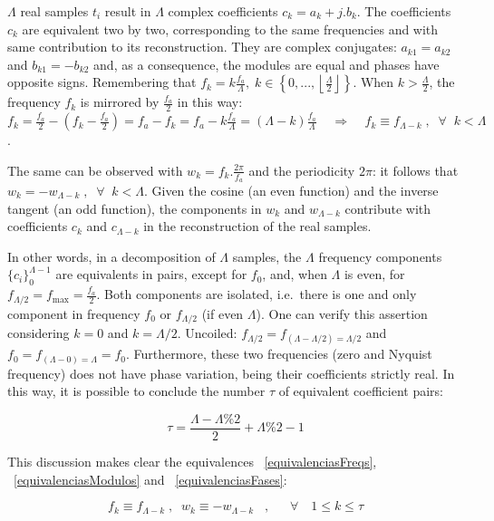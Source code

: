\documentclass[
 aip,
 jmp,
 amsmath,amssymb,
 reprint,
]{revtex4-1}
\begin{document}
$\Lambda$ real samples $t_i$ result in $\Lambda$ complex coefficients $c_k=a_k+j.b_k$. The coefficients $c_k$ are equivalent two by two, corresponding to the same frequencies and with same contribution to its reconstruction. They are complex conjugates: $a_{k1}=a_{k2}$ and $b_{k1}=-b_{k2}$ and, as a consequence, the modules are equal and phases have opposite signs. Remembering that $f_k = k\frac{f_a}{\Lambda}, \; k \in \left\{0, ..., \left \lfloor \frac{\Lambda}{2} \right \rfloor \right\} $. When $k > \frac{\Lambda}{2}$, the frequency $f_k$ is mirrored by $\frac{f_a}{2}$ in this way: $f_k=\frac{f_a}{2} - (f_k-\frac{f_a}{2})=f_a-f_k=f_a - k\frac{f_a}{\Lambda}=(\Lambda-k)\frac{f_a}{\Lambda} \;\;\;\; \Rightarrow \;\;\;\; f_k\equiv f_{\Lambda-k} \; ,\;\; \forall \;\; k<\Lambda$. 

The same can be observed with $w_k=f_k.\frac{2\pi}{f_a}$ and the periodicity $2\pi$: it follows that $w_k=-w_{\Lambda-k} \; ,\;\; \forall \;\; k<\Lambda$. Given the cosine (an even function) and the inverse tangent (an odd function), the components in $w_k$ and $w_{\Lambda-k}$ contribute with coefficients $c_k$ and $c_{\Lambda-k}$ in the reconstruction of the real samples.

In other words, in a decomposition of $\Lambda$ samples, the $\Lambda$ frequency components $\{c_i\}_0^{\Lambda-1}$ are equivalents in pairs,
except for $f_0$, and, when $\Lambda$ is even, for $f_{\Lambda/2}=f_{\text{max}}=\frac{f_a}{2}$. Both components are isolated, i.e.\ there is one and only component in frequency $f_0$ or $f_{\Lambda/2}$ (if even $\Lambda$). 
One can verify this assertion considering $k=0$ and $k=\Lambda/2$. Uncoiled: $f_{\Lambda/2}=f_{(\Lambda-\Lambda/2) = \Lambda/2}$ and $f_0=f_{(\Lambda-0)=\Lambda}=f_0$.
Furthermore, these two frequencies (zero and Nyquist frequency) does not have phase variation, being their coefficients strictly real. In this way, it is possible to conclude the number $\tau$ of equivalent coefficient pairs:

\begin{equation}\label{coefsPareados}
\tau = \frac{\Lambda - \Lambda \% 2}{2} +\Lambda \% 2 -1
\end{equation}

This discussion makes clear the equivalences ~\ref{equivalenciasFreqs}, ~\ref{equivalenciasModulos} and ~\ref{equivalenciasFases}:

\begin{equation}\label{equivalenciasFreqs}
f_{k}\equiv f_{\Lambda-k}\;, \;\; w_{k}\equiv-w_{\Lambda-k}\;\;\;, \quad \;\; \forall \quad 1 \leq k \leq \tau  
\end{equation}
\end{document}
